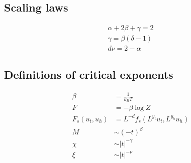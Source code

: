 \subsection{Scaling laws}
\begin{align}
	\alpha + 2\beta + \gamma = 2\\
	\gamma = \beta(\delta -1)\\
	d\nu = 2 - \alpha
\end{align}
\subsection{Definitions of critical exponents}
\begin{align}
  \beta &= \frac{1}{k_B T} \\
  F &= -\beta \log Z\\
  F_s(u_t,u_h) &= L^{-d}f_s(L^{y_t}u_t,L^{y_h}u_h)\\
  M &\sim (-t)^{\beta}\\
  \chi &\sim |t|^{-\gamma}\\
  \xi &\sim |t|^{-\nu}
\end{align}  
